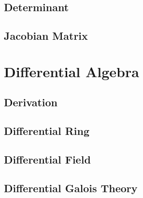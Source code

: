 \subsection{Determinant}\label{sec:determinant}

\subsection{Jacobian Matrix}\label{sec:jacobian_matrix}



\section{Differential Algebra}\label{sec:differential_algebra}

\subsection{Derivation}\label{sec:derivation}

\subsection{Differential Ring}\label{sec:differential_ring}

\subsection{Differential Field}\label{sec:differential_field}

\subsection{Differential Galois Theory}\label{sec:differential_galois}

